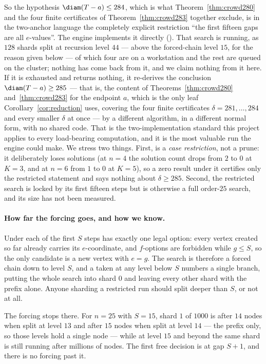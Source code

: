 So the hypothesis $\diam(T-a)\le284$, which is what
Theorem~\ref{thm:crowd280} and the four finite certificates of
Theorem~\ref{thm:crowd283} together exclude, is in the two-anchor language the
completely explicit restriction ``the first fifteen gaps are all $e$-values''.
The engine implements it directly ().  That search is
running, as $128$ shards split at recursion level $44$ --- above the
forced-chain level $15$, for the reason given below --- of which four are on a
workstation and the rest are queued on the cluster; nothing has come back from
it, and we claim nothing from it here.  If it is exhausted and returns nothing,
it
re-derives the conclusion $\diam(T-a)\ge285$ --- that is, the content of
Theorems~\ref{thm:crowd280} and~\ref{thm:crowd283} for the endpoint $a$, which
is the only leaf Corollary~\ref{cor:reduction} uses, covering the four finite
certificates $\delta=281,\dots,284$ and every smaller $\delta$ at once --- by a
different algorithm, in a different normal form, with no shared code.  That is
the two-implementation standard this project applies to every load-bearing
computation, and it is the most valuable run the engine could make.  We stress
two things.  First,
 is a \emph{case restriction}, not a prune: it deliberately
loses solutions (at $n=4$ the solution count drops from $2$ to $0$ at $K=3$, and
at $n=6$ from $1$ to $0$ at $K=5$), so a zero result under it certifies only the
restricted statement and says nothing about $\delta\ge285$.  Second, the
restricted search is locked by its first fifteen steps but is otherwise a full
order-$25$ search, and its size has not been measured.
\paragraph{How far the forcing goes, and how we know.}
Under  each of the first $S$ steps has exactly one legal
option: every vertex created so far already carries its $e$-coordinate, and
$f$-options are forbidden while $g\le S$, so the only candidate is a new vertex
with $e=g$.  The search is therefore a forced chain down to level $S$, and a
 taken at any level below $S$ numbers a single branch, putting the
whole search into shard $0$ and leaving every other shard with the prefix alone.
Anyone sharding a restricted run should split deeper than $S$, or not at all.

The forcing stops there.  For $n=25$ with $S=15$, shard $1$ of $1000$ is
 after $14$ nodes when split at level $13$ and after $15$ nodes
when split at level $14$ --- the prefix only, so those levels hold a single node
--- while at level $15$ and beyond the same shard is still running after
millions of nodes.  The first free decision is at gap $S+1$, and there is no
forcing past it.

